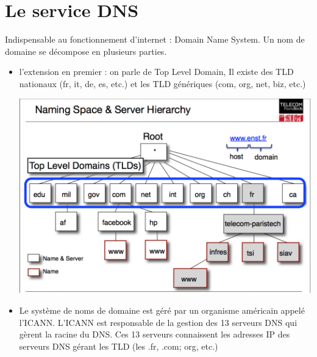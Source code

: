 \documentclass[a4paper,9pt, twocolumn]{article}
\begin{document}
\section*{Le service DNS}
Indispensable au fonctionnement d'internet : Domain Name System. Un nom de domaine se décompose en plusieurs parties.
\begin{itemize}
\item l'extension en premier : on parle de Top Level Domain, Il existe des TLD nationaux (fr, it, de, es, etc.) et les TLD génériques (com, org, net, biz, etc.)

\includegraphics[scale=0.45]{dns.png}
\item Le système de noms de domaine est géré par un organisme américain appelé l'ICANN. L'ICANN est responsable de la gestion des 13 serveurs DNS qui gèrent la racine du DNS. Ces 13 serveurs connaissent les adresses IP des serveurs DNS gérant les TLD (les .fr, .com; org, etc.)
\end{itemize}
\end{document}
